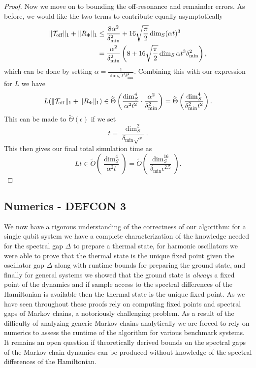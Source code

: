 \documentclass{article}
\newcommand{\off}{\rm off}
\newcommand{\parens}[1]{\left( #1 \right)}
\newcommand{\norm}[1]{\| #1 \|}
\newcommand{\TT}{\mathcal{T}}
\begin{document}
\begin{proof}
Now we move on to bounding the off-resonance and remainder errors. As before, we would like the two terms to contribute equally asymptotically
\begin{align}
    \norm{\TT_{\off}}_1 + \norm{R_{\Phi}}_1 &\le \frac{8 \alpha^2}{\delta_{\min}^2} + 16 \sqrt{\frac{\pi}{2}} \dim_S (\alpha t)^3 \\
    &= \frac{\alpha^2}{\delta_{\min}^2} \left( 8 + 16 \sqrt{\frac{\pi}{2}} \dim_S \alpha t^3 \delta_{\min}^2 \right),
\end{align}
which can be done by setting $\alpha = \frac{1}{\dim_S t^3 \delta_{\min}^2}$. Combining this with our expression for $L$ we have
\begin{equation}
    L (\norm{\TT_{\off}}_1 + \norm{R_{\Phi}}_1) \in \widetilde{\Theta} \parens{\frac{\dim_S^4}{\alpha^2 t^2} \cdot \frac{\alpha^2}{\delta_{\min}^2}} = \widetilde{\Theta} \parens{\frac{\dim_S^4}{\delta_{\min}^2 t^2} }.
\end{equation}
This can be made to $\widetilde{\Theta}(\epsilon)$ if we set 
\begin{equation}
    t = \frac{\dim_S^2}{\delta_{\min} \sqrt{\epsilon}}.
\end{equation}
This then gives our final total simulation time as
\begin{equation}
    L t \in \widetilde{O} \parens{\frac{\dim_S^4}{\alpha^2 t}} = \widetilde{O} \parens{\frac{\dim_S^{16}}{\delta_{\min} \epsilon^{2.5}} }. 
\end{equation}
\end{proof}


\subsection{Numerics - DEFCON 3} \label{sec:numeric_experiments}



We now have a rigorous understanding of the correctness of our algorithm: for a single qubit system we have a complete characterization of the knowledge needed for the spectral gap $\Delta$ to prepare a thermal state, for harmonic oscillators we were able to prove that the thermal state is the unique fixed point given the oscillator gap $\Delta$ along with runtime bounds for preparing the ground state, and finally for general systems we showed that the ground state is \emph{always} a fixed point of the dynamics and if sample access to the spectral differences of the Hamiltonian is available then the thermal state is the unique fixed point. As we have seen throughout these proofs rely on computing fixed points and spectral gaps of Markov chains, a notoriously challenging problem. As a result of the difficulty of analyzing generic Markov chains analytically we are forced to rely on numerics to assess the runtime of the algorithm for various benchmark systems. It remains an open question if theoretically derived bounds on the spectral gaps of the Markov chain dynamics can be produced without knowledge of the spectral differences of the Hamiltonian. 
\end{document}
